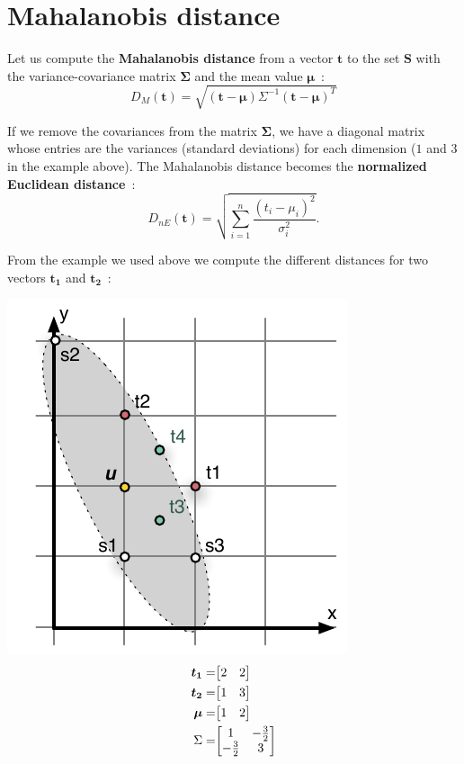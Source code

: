 \documentclass[11pt,twocolumn]{amsart} %
\newcommand{\ve}[1]{\boldsymbol{#1}}
\newcommand{\ma}[1]{\boldsymbol{#1}}
\newenvironment{m}{\begin{bmatrix}}{\end{bmatrix}}
\begin{document}
\section{Mahalanobis distance}

Let us compute the \textbf{Mahalanobis distance} from a vector $\ve{t}$ to the set $\ma{S}$ with the variance-covariance matrix $\ma\Sigma$ and the mean value $\ve{\mu}$~:
\[
  D_M(\ve{t}) = \sqrt{(\ve{t} - \ve{\mu})\Sigma^{-1}(\ve{t} - \ve{\mu})^T}
\]

If we remove the covariances from the matrix $\ma\Sigma$, we have a diagonal matrix whose entries are the variances (standard deviations) for each dimension ($1$ and $3$ in the example above). The Mahalanobis distance becomes the \textbf{normalized Euclidean distance}~:
\[
  D_{nE}(\ve{t}) = \sqrt{\sum_{i=1}^{n}\frac{(t_i - \mu_i)^2}{\sigma_i^2}}.
\]

From the example we used above we compute the different distances for two vectors $\ve{t_1}$ and $\ve{t_2}$~:

\includegraphics{points.pdf}
\begin{align*}
  \ve{t_1}  = & \begin{m} 2 & 2 \end{m} \\
  \ve{t_2}  = & \begin{m} 1 & 3 \end{m} \\
  \ve{\mu} = & \begin{m} 1 & 2 \end{m} \\
  \Sigma    = & \begin{m} 1 & -\frac{3}{2} \\ -\frac{3}{2} & 3\end{m}
\end{align*}
\end{document}
